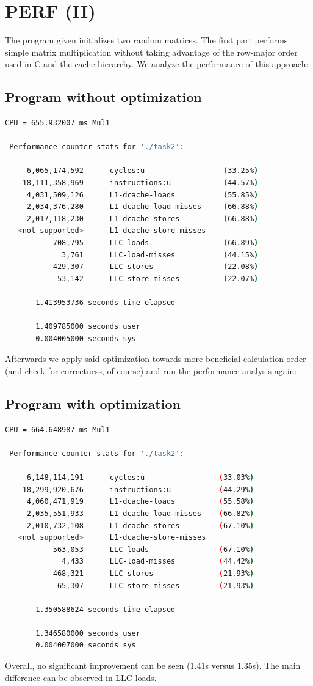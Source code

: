 \documentclass[11pt,a4paper]{article}
\begin{document}
\newpage
\section{PERF (II)}
The program given initializes two random matrices. The first part performs simple matrix multiplication without taking advantage of the row-major order used in C and the cache hierarchy. We analyze the performance of this approach:
\subsection{Program without optimization}
\begin{lstlisting}[language=bash]
CPU = 655.932007 ms Mul1 

 Performance counter stats for './task2':

     6,065,174,592      cycles:u                  (33.25%)
    18,111,358,969      instructions:u            (44.57%)
     4,031,509,126      L1-dcache-loads           (55.85%)
     2,034,376,280      L1-dcache-load-misses     (66.88%)
     2,017,118,230      L1-dcache-stores          (66.88%)
   <not supported>      L1-dcache-store-misses                                      
           708,795      LLC-loads                 (66.89%)
             3,761      LLC-load-misses           (44.15%)
           429,307      LLC-stores                (22.08%)
            53,142      LLC-store-misses          (22.07%)

       1.413953736 seconds time elapsed

       1.409785000 seconds user
       0.004005000 seconds sys
\end{lstlisting}
Afterwards we apply said optimization towards more beneficial calculation order (and check for correctness, of course) and run the performance analysis again:
\subsection{Program with optimization}
\begin{lstlisting}[language=bash]
CPU = 664.648987 ms Mul1 

 Performance counter stats for './task2':

     6,148,114,191      cycles:u                 (33.03%)
    18,299,920,676      instructions:u           (44.29%)
     4,060,471,919      L1-dcache-loads          (55.58%)
     2,035,551,933      L1-dcache-load-misses    (66.82%)
     2,010,732,108      L1-dcache-stores         (67.10%)
   <not supported>      L1-dcache-store-misses                                      
           563,053      LLC-loads                (67.10%)
             4,433      LLC-load-misses          (44.42%)
           468,321      LLC-stores               (21.93%)
            65,307      LLC-store-misses         (21.93%)

       1.350588624 seconds time elapsed

       1.346580000 seconds user
       0.004007000 seconds sys
\end{lstlisting}
Overall, no significant improvement can be seen (1.41s versus 1.35s). The main difference can be observed in LLC-loads. 
\newpage
\end{document}
